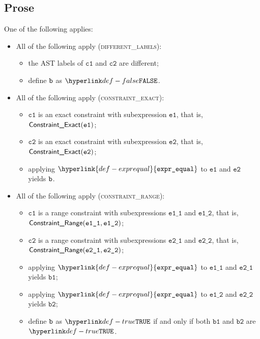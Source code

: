 \documentclass{book}
\newcommand\ProseOrTypeError[0]{\ProseTerminateAs{\TypeErrorConfig}}
\newcommand\exprequal[0]{\hyperlink{def-exprequal}{\texttt{expr\_equal}}}
\newcommand\vcone[0]{\texttt{c1}}
\newcommand\vctwo[0]{\texttt{c2}}
\newcommand\veone[0]{\texttt{e1}}
\newcommand\vetwo[0]{\texttt{e2}}
\newcommand\veoneone[0]{\texttt{e1\_1}}
\newcommand\veonetwo[0]{\texttt{e1\_2}}
\newcommand\vetwoone[0]{\texttt{e2\_1}}
\newcommand\vetwotwo[0]{\texttt{e2\_2}}
\newcommand\vbone[0]{\texttt{b1}}
\newcommand\vbtwo[0]{\texttt{b2}}
\begin{document}
\subsection{Prose}
One of the following applies:
\begin{itemize}
  \item All of the following apply (\textsc{different\_labels}):
  \begin{itemize}
    \item the AST labels of $\vcone$ and $\vctwo$ are different;
    \item define $\texttt{b}$ as $\False$.
  \end{itemize}

  \item All of the following apply (\textsc{constraint\_exact}):
  \begin{itemize}
    \item $\vcone$ is an exact constraint with subexpression $\veone$, that is, $\ConstraintExact(\veone)$;
    \item $\vctwo$ is an exact constraint with subexpression $\vetwo$, that is, $\ConstraintExact(\vetwo)$;
    \item applying $\exprequal$ to $\veone$ and $\vetwo$ yields $\texttt{b}$\ProseOrTypeError.
  \end{itemize}

  \item All of the following apply (\textsc{constraint\_range}):
  \begin{itemize}
    \item $\vcone$ is a range constraint with subexpressions $\veoneone$ and $\veonetwo$, that is, \\ $\ConstraintRange(\veoneone, \veonetwo)$;
    \item $\vctwo$ is a range constraint with subexpressions $\vetwoone$ and $\vetwotwo$, that is, \\ $\ConstraintRange(\vetwoone, \vetwotwo)$;
    \item applying $\exprequal$ to $\veoneone$ and $\vetwoone$ yields $\vbone$\ProseOrTypeError;
    \item applying $\exprequal$ to $\veonetwo$ and $\vetwotwo$ yields $\vbtwo$\ProseOrTypeError;
    \item define $\texttt{b}$ as $\True$ if and only if both $\vbone$ and $\vbtwo$ are $\True$.
  \end{itemize}
\end{itemize}
\end{document}
